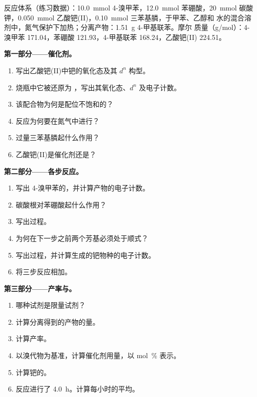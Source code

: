 \begin{problem}
\label{pb:b2:catalytic-cycles:1}
反应体系（练习数据）：\qty{10.0}{mmol} 4-溴甲苯，\qty{12.0}{mmol}
苯硼酸，\qty{20}{mmol} 碳酸钾，\qty{0.050}{mmol}
乙酸钯(II)，\qty{0.10}{mmol} 三苯基膦，于甲苯、乙醇和
水的混合溶剂中，氮气保护下加热；分离产物：\qty{1.51}{g} 4-甲基联苯。摩尔
质量（\unit{g/mol}）：4-溴甲苯 171.04，苯硼酸 121.93，4-甲基联苯
168.24，乙酸钯(II) 224.51。

\medskip
\noindent\textbf{第一部分——催化剂。}
\begin{enumerate}
  \item 写出乙酸钯(II)中钯的氧化态及其 $d^n$ 构型。
  \item 烧瓶中它被还原为 ，写出其氧化态、$d^n$
        及电子计数。
  \item 该配合物为何是配位不饱和的？
  \item 反应为何要在氮气中进行？
  \item 过量三苯基膦起什么作用？
  \item 乙酸钯(II)是催化剂还是？
\end{enumerate}

\medskip
\noindent\textbf{第二部分——各步反应。}
\begin{enumerate}[resume]
  \item 写出 4-溴甲苯的，并计算产物的电子计数。
  \item 碳酸根对苯硼酸起什么作用？
  \item 写出过程。
  \item 为何在下一步之前两个芳基必须处于顺式？
  \item 写出过程，并计算生成的钯物种的电子计数。
  \item 将三步反应相加。
\end{enumerate}

\medskip
\noindent\textbf{第三部分——产率与。}
\begin{enumerate}[resume]
  \item 哪种试剂是限量试剂？
  \item 计算分离得到的产物的量。
  \item 计算产率。
  \item 以溴代物为基准，计算催化剂用量，以 mol~\% 表示。
  \item 计算钯的。
  \item 反应进行了 \qty{4.0}{h}。计算每小时的平均。
\end{enumerate}


\end{problem}
